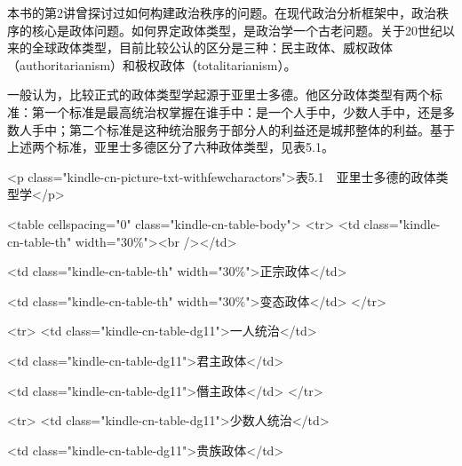 





本书的第2讲曾探讨过如何构建政治秩序的问题。在现代政治分析框架中，政治秩序的核心是政体问题。如何界定政体类型，是政治学一个古老问题。关于20世纪以来的全球政体类型，目前比较公认的区分是三种：民主政体、威权政体（authoritarianism）和极权政体（totalitarianism）。

一般认为，比较正式的政体类型学起源于亚里士多德。他区分政体类型有两个标准：第一个标准是最高统治权掌握在谁手中：是一个人手中，少数人手中，还是多数人手中；第二个标准是这种统治服务于部分人的利益还是城邦整体的利益。基于上述两个标准，亚里士多德区分了六种政体类型，见表5.1。

<p class="kindle-cn-picture-txt-withfewcharactors">表5.1　亚里士多德的政体类型学</p>

<table cellspacing="0" class="kindle-cn-table-body">
 <tr>
 <td class="kindle-cn-table-th" width="30\%"><br /></td>

 <td class="kindle-cn-table-th" width="30\%">正宗政体</td>

 <td class="kindle-cn-table-th" width="30\%">变态政体</td>
</tr>

 <tr>
 <td class="kindle-cn-table-dg11">一人统治</td>

 <td class="kindle-cn-table-dg11">君主政体</td>

 <td class="kindle-cn-table-dg11">僭主政体</td>
</tr>

 <tr>
 <td class="kindle-cn-table-dg11">少数人统治</td>

 <td class="kindle-cn-table-dg11">贵族政体</td>

